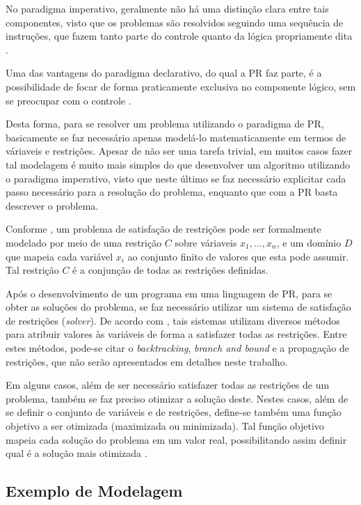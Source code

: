 No paradigma imperativo, geralmente não há uma distinção clara entre tais componentes, visto que os problemas são resolvidos seguindo uma sequência de instruções, que fazem tanto parte do controle quanto da lógica propriamente dita \cite{thom}.

Uma das vantagens do paradigma declarativo, do qual a PR faz parte, é a possibilidade de focar de forma praticamente exclusiva no componente lógico, sem se preocupar com o controle \cite{thom}.

Desta forma, para se resolver um problema utilizando o paradigma de PR, basicamente se faz necessário apenas modelá-lo matematicamente em termos de váriaveis e restrições. Apesar de não ser uma tarefa trivial, em muitos casos fazer tal modelagem é muito mais simples do que desenvolver um algoritmo utilizando o paradigma imperativo, visto que neste último se faz necessário explicitar cada passo necessário para a resolução do problema, enquanto que com a PR basta descrever o problema.

Conforme \cite{stuckey}, um problema de satisfação de restrições pode ser formalmente modelado por meio de uma restrição $C$ sobre váriaveis $x_1, ..., x_n$, e um domínio $D$ que mapeia cada variável $x_i$ ao conjunto finito de valores que esta pode assumir. Tal restrição $C$ é a conjunção de todas as restrições definidas.

Após o desenvolvimento de um programa em uma linguagem de PR, para se obter as soluções do problema, se faz necessário utilizar um sistema de satisfação de restrições (\textit{solver}). De acordo com \cite{cphandbook}, tais sistemas utilizam diversos métodos para atribuir valores às variáveis de forma a satisfazer todas as restrições. Entre estes métodos, pode-se citar o \textit{backtracking}, \textit{branch and bound} e a propagação de restrições, que não serão apresentados em detalhes neste trabalho.

Em alguns casos, além de ser necessário satisfazer todas as restrições de um problema, também se faz preciso otimizar a solução deste. Nestes casos, além de se definir o conjunto de variáveis e de restrições, define-se também uma função objetivo a ser otimizada (maximizada ou minimizada). Tal função objetivo mapeia cada solução do problema em um valor real, possibilitando assim definir qual é a solução mais otimizada \cite{apt}.

\subsection{Exemplo de Modelagem}
\label{ss:exemplo-de-modelagem}


